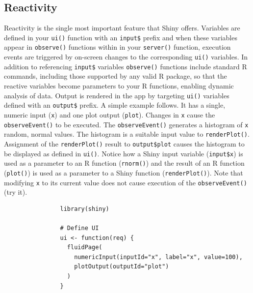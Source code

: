 \documentclass[10pt, letterpaper]{article}
\begin{document}
\begin{spacing}{1.0}


\section{Reactivity}\label{sec:reactivity}

Reactivity is the single most important feature that Shiny offers.  Variables are defined in your \texttt{ui()} function with an \texttt{input\$} prefix and when these variables appear in \texttt{observe()} functions within in your \texttt{server()} function, execution events are triggered by on-screen changes to the corresponding \texttt{ui()} variables.  In addition to referencing \texttt{input\$} variables \texttt{observe()} functions include standard R commands, including those supported by any valid R package, so that the reactive variables become parameters to your R functions, enabling dynamic analysis of data.  Output is rendered in the app by targeting \texttt{ui()} variables defined with an \texttt{output\$} prefix.  A simple example follows.  It has a single, numeric input (\texttt{x}) and one plot output (\texttt{plot}).  Changes in \texttt{x} cause the \texttt{observeEvent()} to be executed.  The \texttt{observeEvent()} generates a histogram of \texttt{x} random, normal values.  The histogram is a suitable input value to \texttt{renderPlot()}.  Assignment of the \texttt{renderPlot()} result to \texttt{output\$plot} causes the histogram to be displayed as defined in \texttt{ui()}.  Notice how a Shiny input variable (\texttt{input\$x}) is used as a parameter to an R function (\texttt{rnorm()}) and the result of an R function (\texttt{plot()}) is used as a parameter to a Shiny function (\texttt{renderPlot()}).  Note that modifying \texttt{x} to its current value does not cause execution of the \texttt{observeEvent()} (try it).

\vspace{0.1in}

\small
\begin{verbatim}
                library(shiny)
                
                # Define UI
                ui <- function(req) {
                  fluidPage(
                    numericInput(inputId="x", label="x", value=100),
                    plotOutput(outputId="plot")
                  )
                }
                

\end{verbatim}
\end{spacing}
\end{document}
